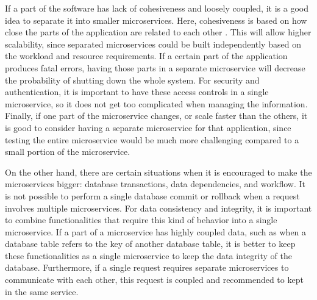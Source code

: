 If a part of the software has lack of cohesiveness and loosely coupled, it is a good idea to separate it into smaller microservices. 
Here, cohesiveness is based on how close the parts of the application are related to each other \cite{Gandhi_Richards_Ford_2024}.
This will allow higher scalability, since separated microservices could be built independently based on the workload and resource requirements.
If a certain part of the application produces fatal errors,
having those parts in a separate microservice will decrease the probability of shutting down the whole system.
For security and authentication, it is important to have these access controls in a single microservice,
so it does not get too complicated when managing the information. Finally, if one part of the microservice changes,
or scale faster than the others, it is good to consider having a separate microservice for that application,
since testing the entire microservice would be much more challenging compared to a small portion of the microservice.

On the other hand, there are certain situations when it is encouraged to make the microservices bigger: database transactions, data dependencies, and workflow.
It is not possible to perform a single database commit or rollback when a request involves multiple microservices.
For data consistency and integrity, it is important to combine functionalities that require this kind of behavior into a single microservice.
If a part of a microservice has highly coupled data, such as when a database table refers to the key of another database table,
it is better to keep these functionalities as a single microservice to keep the data integrity of the database.
Furthermore, if a single request requires separate microservices to communicate with each other, 
this request is coupled and recommended to kept in the same service. \\



